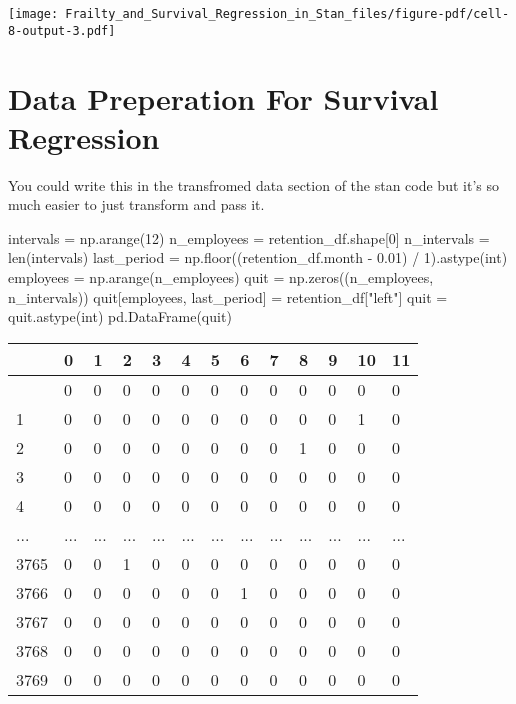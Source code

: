 \documentclass[
  letterpaper,
  DIV=11,
  numbers=noendperiod]{scrartcl}
\newenvironment{Shaded}{\begin{snugshade}}{\end{snugshade}}
\newcommand{\BuiltInTok}[1]{\textcolor[rgb]{0.00,0.23,0.31}{#1}}
\newcommand{\DecValTok}[1]{\textcolor[rgb]{0.68,0.00,0.00}{#1}}
\newcommand{\FloatTok}[1]{\textcolor[rgb]{0.68,0.00,0.00}{#1}}
\newcommand{\NormalTok}[1]{\textcolor[rgb]{0.00,0.23,0.31}{#1}}
\newcommand{\OperatorTok}[1]{\textcolor[rgb]{0.37,0.37,0.37}{#1}}
\newcommand{\StringTok}[1]{\textcolor[rgb]{0.13,0.47,0.30}{#1}}
\begin{document}
\texttt{[image: Frailty\_and\_Survival\_Regression\_in\_Stan\_files/figure-pdf/cell-8-output-3.pdf]}

\section{Data Preperation For Survival
Regression}\label{data-preperation-for-survival-regression}

You could write this in the transfromed data section of the stan code
but it's so much easier to just transform and pass it.

\begin{Shaded}
\begin{Highlighting}[]
\NormalTok{intervals }\OperatorTok{=}\NormalTok{ np.arange(}\DecValTok{12}\NormalTok{)}
\NormalTok{n\_employees }\OperatorTok{=}\NormalTok{ retention\_df.shape[}\DecValTok{0}\NormalTok{]}
\NormalTok{n\_intervals }\OperatorTok{=} \BuiltInTok{len}\NormalTok{(intervals)}
\NormalTok{last\_period }\OperatorTok{=}\NormalTok{ np.floor((retention\_df.month }\OperatorTok{{-}} \FloatTok{0.01}\NormalTok{) }\OperatorTok{/} \DecValTok{1}\NormalTok{).astype(}\BuiltInTok{int}\NormalTok{)}
\NormalTok{employees }\OperatorTok{=}\NormalTok{ np.arange(n\_employees)}
\NormalTok{quit }\OperatorTok{=}\NormalTok{ np.zeros((n\_employees, n\_intervals))}
\NormalTok{quit[employees, last\_period] }\OperatorTok{=}\NormalTok{ retention\_df[}\StringTok{"left"}\NormalTok{]}
\NormalTok{quit }\OperatorTok{=}\NormalTok{ quit.astype(}\BuiltInTok{int}\NormalTok{)}
\NormalTok{pd.DataFrame(quit)}
\end{Highlighting}
\end{Shaded}

\begin{longtable}[]{@{}lllllllllllll@{}}
\toprule\noalign{}
& 0 & 1 & 2 & 3 & 4 & 5 & 6 & 7 & 8 & 9 & 10 & 11 \\
\midrule\noalign{}
\endhead
\bottomrule\noalign{}
\endlastfoot
0 & 0 & 0 & 0 & 0 & 0 & 0 & 0 & 0 & 0 & 0 & 0 & 0 \\
1 & 0 & 0 & 0 & 0 & 0 & 0 & 0 & 0 & 0 & 0 & 1 & 0 \\
2 & 0 & 0 & 0 & 0 & 0 & 0 & 0 & 0 & 1 & 0 & 0 & 0 \\
3 & 0 & 0 & 0 & 0 & 0 & 0 & 0 & 0 & 0 & 0 & 0 & 0 \\
4 & 0 & 0 & 0 & 0 & 0 & 0 & 0 & 0 & 0 & 0 & 0 & 0 \\
... & ... & ... & ... & ... & ... & ... & ... & ... & ... & ... & ... &
... \\
3765 & 0 & 0 & 1 & 0 & 0 & 0 & 0 & 0 & 0 & 0 & 0 & 0 \\
3766 & 0 & 0 & 0 & 0 & 0 & 0 & 1 & 0 & 0 & 0 & 0 & 0 \\
3767 & 0 & 0 & 0 & 0 & 0 & 0 & 0 & 0 & 0 & 0 & 0 & 0 \\
3768 & 0 & 0 & 0 & 0 & 0 & 0 & 0 & 0 & 0 & 0 & 0 & 0 \\
3769 & 0 & 0 & 0 & 0 & 0 & 0 & 0 & 0 & 0 & 0 & 0 & 0 \\
\end{longtable}
\end{document}
